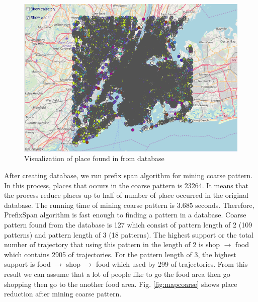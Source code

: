 \documentclass[conference]{IEEEtran}
\begin{document}
\begin{figure}[h!]
	\centering
	\includegraphics[width=1\linewidth]{mapDatabase}
	\caption{Visualization of place found in from database}
	\label{fig:mapdatabase}
\end{figure}

After creating database, we run prefix span algorithm for mining coarse pattern. In this process, places that occurs in the coarse pattern is 23264. It means that the process reduce places up to half of number of place occurred in the original database. The running time of mining coarse pattern is 3.685 seconds. Therefore, PrefixSpan algorithm is fast enough to finding a pattern in a database. Coarse pattern found from the database is 127 which consist of pattern length of 2 (109 patterns) and pattern length of 3 (18 patterns). The highest support or the total number of trajectory that using this pattern in the length of 2 is shop $\rightarrow$ food which contains 2905 of trajectories. For the pattern length of 3, the highest support is food $\rightarrow$ shop $\rightarrow$ food which used by 299 of trajectories. From this result we can assume that a lot of people like to go the food area then go shopping then go to the another food area. Fig. \ref{fig:mapcoarse} shows place reduction after mining coarse pattern.
\end{document}
